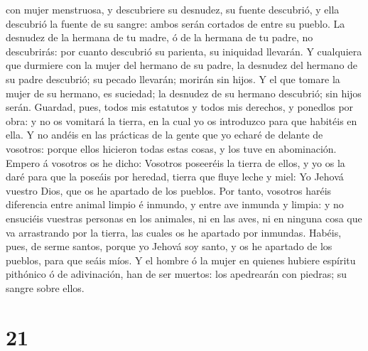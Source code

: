 con mujer menstruosa, y descubriere su desnudez, su fuente descubrió, y
ella descubrió la fuente de su sangre: ambos serán cortados de entre su
pueblo.  La desnudez de la hermana de tu madre, ó de la
hermana de tu padre, no descubrirás: por cuanto descubrió su parienta,
su iniquidad llevarán.  Y cualquiera que durmiere con la
mujer del hermano de su padre, la desnudez del hermano de su padre
descubrió; su pecado llevarán; morirán sin hijos.  Y el
que tomare la mujer de su hermano, es suciedad; la desnudez de su
hermano descubrió; sin hijos serán.  Guardad, pues, todos
mis estatutos y todos mis derechos, y ponedlos por obra: y no os
vomitará la tierra, en la cual yo os introduzco para que habitéis en
ella.  Y no andéis en las prácticas de la gente que yo
echaré de delante de vosotros: porque ellos hicieron todas estas cosas,
y los tuve en abominación.  Empero á vosotros os he
dicho: Vosotros poseeréis la tierra de ellos, y yo os la daré para que
la poseáis por heredad, tierra que fluye leche y miel: Yo Jehová vuestro
Dios, que os he apartado de los pueblos.  Por tanto,
vosotros haréis diferencia entre animal limpio é inmundo, y entre ave
inmunda y limpia: y no ensuciéis vuestras personas en los animales, ni
en las aves, ni en ninguna cosa que va arrastrando por la tierra, las
cuales os he apartado por inmundas.  Habéis, pues, de
serme santos, porque yo Jehová soy santo, y os he apartado de los
pueblos, para que seáis míos.  Y el hombre ó la mujer en
quienes hubiere espíritu pithónico ó de adivinación, han de ser muertos:
los apedrearán con piedras; su sangre sobre ellos.

\hypertarget{section-20}{%
\section{21}\label{section-20}}

